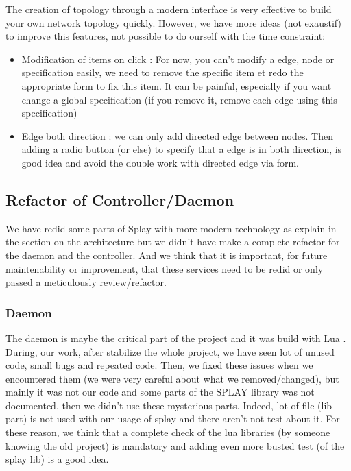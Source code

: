 \documentclass{eplmastersthesis}
\begin{document}
          The creation of topology through a modern interface is very effective to build your own 
          network topology quickly. However, we have more ideas (not exaustif) to improve this features, not possible to do ourself 
          with the time constraint: 
          \begin{itemize}
            \item Modification of items on click : For now, you can't modify a edge, node or specification 
            easily, we need to remove the specific item et redo the appropriate form to fix this item. It can 
            be painful, especially if you want change a global specification (if you remove it, remove each edge using this specification)
            \item Edge both direction : we can only add directed edge between nodes. 
            Then adding a radio button (or else) to specify that a edge is in both direction, is good idea and avoid 
            the double work with directed edge via form.
          \end{itemize}

      \subsection{Refactor of Controller/Daemon}
        We have redid some parts of Splay with more modern technology as explain in the section on the architecture but 
        we didn't have make a complete refactor for the daemon and the controller. And we think that it is important,
        for future maintenability or improvement, that these services need to be redid or only passed a meticulously review/refactor.

        \subsubsection{Daemon}
          The daemon is maybe the critical part of the project and it was build with Lua \cite{Lua}. During, our work, after 
          stabilize the whole project, we have seen lot of unused code, small bugs and repeated code. Then, 
          we fixed these issues when we encountered them (we were very careful about what we removed/changed), but 
          mainly it was not our code and some parts of the SPLAY library was not documented, then we didn't use these 
          mysterious parts. Indeed, lot of file (lib part) is not used with our usage of splay and there aren't not test 
          about it. For these reason, we think that a complete check of the lua libraries (by someone knowing the old project) is mandatory 
          and adding even more busted test (of the splay lib) is a good idea. \\
\end{document}
